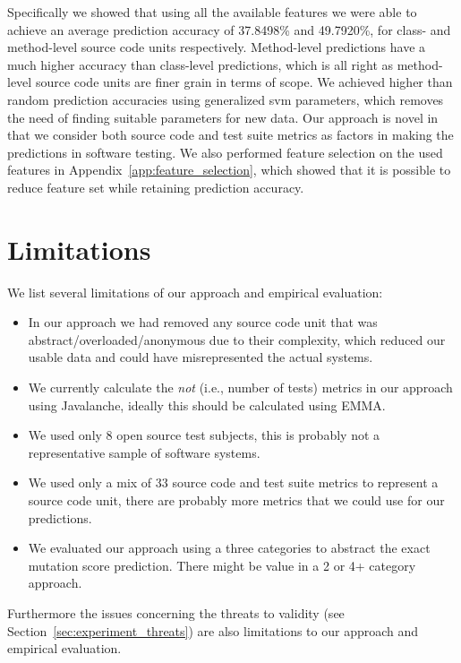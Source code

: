 Specifically we showed that using all the available features we were able to achieve an average prediction accuracy of 37.8498\% and 49.7920\%, for class- and method-level source code units respectively. Method-level predictions have a much higher accuracy than class-level predictions, which is all right as method-level source code units are finer grain in terms of scope. We achieved higher than random prediction accuracies using generalized \gls{svm} parameters, which removes the need of finding suitable parameters for new data. Our approach is novel in that we consider both source code and test suite metrics as factors in making the predictions in software testing. We also performed feature selection on the used features in Appendix~\ref{app:feature_selection}, which showed that it is possible to reduce feature set while retaining prediction accuracy.


\section{Limitations}
\label{sec:conclusions_limitations}
We list several limitations of our approach and empirical evaluation:

\begin{itemize}
	\item In our approach we had removed any source code unit that was abstract/overloaded/anonymous due to their complexity, which reduced our usable data and could have misrepresented the actual systems.
	\item We currently calculate the \emph{not} (i.e., number of tests) metrics in our approach using Javalanche, ideally this should be calculated using EMMA.
	\item We used only 8 open source test subjects, this is probably not a representative sample of software systems.
	\item We used only a mix of 33 source code and test suite metrics to represent a source code unit, there are probably more metrics that we could use for our predictions.
	\item We evaluated our approach using a three categories to abstract the exact mutation score prediction. There might be value in a 2 or 4+ category approach.
\end{itemize}

Furthermore the issues concerning the threats to validity (see Section~\ref{sec:experiment_threats}) are also limitations to our approach and empirical evaluation.


